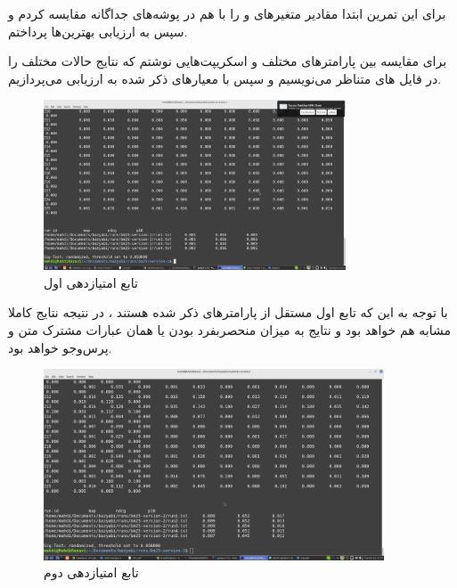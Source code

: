 \begin{boxA}
    برای این تمرین ابتدا مقادیر متغیرهای
    و 
    را با هم در پوشه‌های جداگانه مقایسه کردم و سپس به ارزیابی بهترین‌ها پرداختم.

    برای مقایسه بین پارامترهای مختلف 
    و
    اسکریپت‌هایی نوشتم که 
    نتایج 
    حالات مختلف را در فایل
    ‌های متناظر می‌نویسیم و سپس با معیارهای ذکر شده به ارزیابی می‌پردازیم.
\end{boxA}


\begin{figure}[h]
\centering
\includegraphics[width=0.8\textwidth]{IR1/images/V1.png}
\caption{تابع امتیازدهی اول}
\end{figure}

\begin{boxM}
    با توجه به این که تابع اول مستقل از پارامترهای ذکر شده هستند ، در نتیجه نتایج کاملا مشابه هم خواهد بود و نتایج به میزان منحصربفرد بودن 
    یا همان
    عبارات مشترک متن و پرس‌وجو خواهد بود.
\end{boxM}

\newpage

\begin{figure}[h]
\centering
\includegraphics[width=0.9\textwidth]{IR1/images/V2.png}
\caption{تابع امتیازدهی دوم}
\end{figure}

